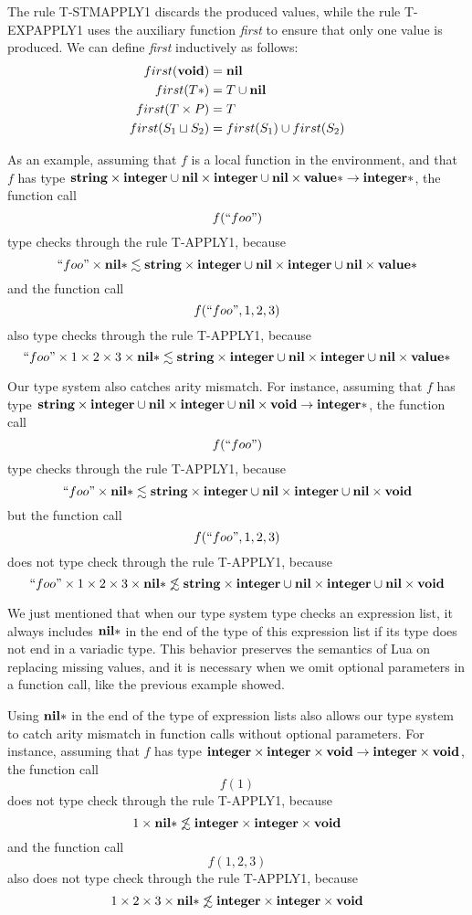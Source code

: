 The rule \textsc{T-STMAPPLY1} discards the produced values,
while the rule \textsc{T-EXPAPPLY1} uses the auxiliary function
\emph{first} to ensure that only one value is produced.
We can define \emph{first} inductively as follows:
\begin{align*}
first(\mathbf{void}) & = \mathbf{nil}\\
first(T{*}) & = T \cup \mathbf{nil}\\
first(T \times P) & = T\\
first(S_{1} \sqcup S_{2}) & = first(S_{1}) \cup first(S_{2})
\end{align*}

As an example, assuming that $f$ is a local function in the environment, and that $f$ has type
$\mathbf{string} \times \mathbf{integer} \cup \mathbf{nil} \times \mathbf{integer} \cup \mathbf{nil} \times \mathbf{value}{*} \rightarrow \mathbf{integer}{*}$,
the function call
\[
f(``foo")
\]
type checks through the rule \textsc{T-APPLY1}, because
\[
``foo" \times \mathbf{nil}{*} \lesssim \mathbf{string} \times \mathbf{integer} \cup \mathbf{nil} \times \mathbf{integer} \cup \mathbf{nil} \times \mathbf{value}{*}
\]
and the function call
\[
f(``foo",1,2,3)
\]
also type checks through the rule \textsc{T-APPLY1}, because
\[
``foo" \times 1 \times 2 \times 3 \times \mathbf{nil}{*} \lesssim \mathbf{string} \times \mathbf{integer} \cup \mathbf{nil} \times \mathbf{integer} \cup \mathbf{nil} \times \mathbf{value}{*}
\]

Our type system also catches arity mismatch.
For instance, assuming that $f$ has type
$\mathbf{string} \times \mathbf{integer} \cup \mathbf{nil} \times \mathbf{integer} \cup \mathbf{nil} \times \mathbf{void} \rightarrow \mathbf{integer}{*}$,
the function call
\[
f(``foo")
\]
type checks through the rule \textsc{T-APPLY1}, because
\[
``foo" \times \mathbf{nil}{*} \lesssim \mathbf{string} \times \mathbf{integer} \cup \mathbf{nil} \times \mathbf{integer} \cup \mathbf{nil} \times \mathbf{void}
\]
but the function call
\[
f(``foo",1,2,3)
\]
does not type check through the rule \textsc{T-APPLY1}, because
\[
``foo" \times 1 \times 2 \times 3 \times \mathbf{nil}{*} \not\lesssim \mathbf{string} \times \mathbf{integer} \cup \mathbf{nil} \times \mathbf{integer} \cup \mathbf{nil} \times \mathbf{void}
\]

We just mentioned that when our type system type checks an expression list,
it always includes $\mathbf{nil}{*}$ in the end of the type of this expression list
if its type does not end in a variadic type.
This behavior preserves the semantics of Lua on replacing missing values,
and it is necessary when we omit optional parameters in a function call,
like the previous example showed.

Using $\mathbf{nil}{*}$ in the end of the type of expression lists also allows
our type system to catch arity mismatch in function calls without optional parameters.
For instance, assuming that $f$ has type
$\mathbf{integer} \times \mathbf{integer} \times \mathbf{void} \rightarrow \mathbf{integer} \times \mathbf{void}$,
the function call
\[
f(1)
\]
does not type check through the rule \textsc{T-APPLY1}, because
\[
1 \times \mathbf{nil}{*} \not\lesssim \mathbf{integer} \times \mathbf{integer} \times \mathbf{void}
\]
and the function call
\[
f(1,2,3)
\]
also does not type check through the rule \textsc{T-APPLY1}, because
\[
1 \times 2 \times 3 \times \mathbf{nil}{*} \not\lesssim \mathbf{integer} \times \mathbf{integer} \times \mathbf{void}
\]

